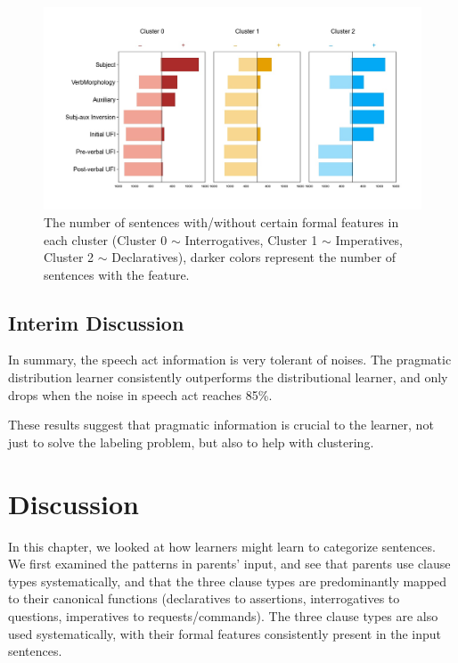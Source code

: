 \begin{figure}[H]
    \centering
    \includegraphics[width=1\textwidth]{figures/noisy100-syncluster.jpg}
    \caption{The number of sentences with/without certain formal features in each cluster (Cluster 0 $\sim$ Interrogatives, Cluster 1 $\sim$ Imperatives, Cluster 2 $\sim$ Declaratives), darker colors represent the number of sentences with the feature.}
    \label{fig:noisy100-syncluster}
\end{figure}




\subsection{Interim Discussion}
\label{sec:engcl:model:disc}
In summary, the speech act information is very tolerant of noises. The pragmatic distribution learner consistently outperforms the distributional learner, and only drops when the noise in speech act reaches 85\%. 

These results suggest that pragmatic information is crucial to the learner, not just to solve the labeling problem, but also to help with clustering. 

\section{Discussion}
\label{sec:engcl:discussion}

In this chapter, we looked at how learners might learn to categorize sentences. We first examined the patterns in parents' input, and see that parents use clause types systematically, and that the three clause types are predominantly mapped to their canonical functions (declaratives to assertions, interrogatives to questions, imperatives to requests/commands). The three clause types are also used systematically, with their formal features consistently present in the input sentences. 

